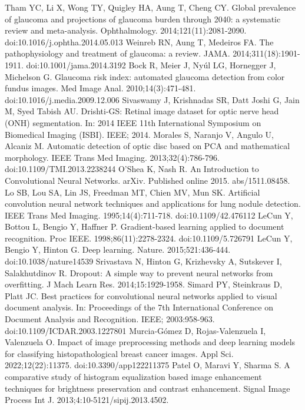 \documentclass{article}
\begin{document}

\begin{thebibliography}{99.}
 Tham YC, Li X, Wong TY, Quigley HA, Aung T, Cheng CY. Global prevalence of glaucoma and projections of glaucoma burden through 2040: a systematic review and meta-analysis. Ophthalmology. 2014;121(11):2081-2090. doi:10.1016/j.ophtha.2014.05.013
 Weinreb RN, Aung T, Medeiros FA. The pathophysiology and treatment of glaucoma: a review. JAMA. 2014;311(18):1901-1911. doi:10.1001/jama.2014.3192
 Bock R, Meier J, Nyúl LG, Hornegger J, Michelson G. Glaucoma risk index: automated glaucoma detection from color fundus images. Med Image Anal. 2010;14(3):471-481. doi:10.1016/j.media.2009.12.006
 Sivaswamy J, Krishnadas SR, Datt Joshi G, Jain M, Syed Tabish AU. Drishti-GS: Retinal image dataset for optic nerve head (ONH) segmentation. In: 2014 IEEE 11th International Symposium on Biomedical Imaging (ISBI). IEEE; 2014.
 Morales S, Naranjo V, Angulo U, Alcaniz M. Automatic detection of optic disc based on PCA and mathematical morphology. IEEE Trans Med Imaging. 2013;32(4):786-796. doi:10.1109/TMI.2013.2238244
 O'Shea K, Nash R. An Introduction to Convolutional Neural Networks. arXiv. Published online 2015. abs/1511.08458.
 Lo SB, Lou SA, Lin JS, Freedman MT, Chien MV, Mun SK. Artificial convolution neural network techniques and applications for lung nodule detection. IEEE Trans Med Imaging. 1995;14(4):711-718. doi:10.1109/42.476112
 LeCun Y, Bottou L, Bengio Y, Haffner P. Gradient-based learning applied to document recognition. Proc IEEE. 1998;86(11):2278-2324. doi:10.1109/5.726791
 LeCun Y, Bengio Y, Hinton G. Deep learning. Nature. 2015;521:436-444. doi:10.1038/nature14539
 Srivastava N, Hinton G, Krizhevsky A, Sutskever I, Salakhutdinov R. Dropout: A simple way to prevent neural networks from overfitting. J Mach Learn Res. 2014;15:1929-1958.
 Simard PY, Steinkraus D, Platt JC. Best practices for convolutional neural networks applied to visual document analysis. In: Proceedings of the 7th International Conference on Document Analysis and Recognition. IEEE; 2003:958-963. doi:10.1109/ICDAR.2003.1227801
 Murcia-Gómez D, Rojas-Valenzuela I, Valenzuela O. Impact of image preprocessing methods and deep learning models for classifying histopathological breast cancer images. Appl Sci. 2022;12(22):11375. doi:10.3390/app122211375
 Patel O, Maravi Y, Sharma S. A comparative study of histogram equalization based image enhancement techniques for brightness preservation and contrast enhancement. Signal Image Process Int J. 2013;4:10-5121/sipij.2013.4502.

\end{thebibliography}
\end{document}
